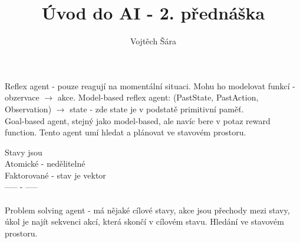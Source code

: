 \documentclass{article}
\title{Úvod do AI - 2. přednáška}
\author{Vojtěch Šára}
\begin{document}
\maketitle
Reflex agent - pouze reagují na momentální situaci. Mohu ho modelovat funkcí - obzervace $\rightarrow$ akce. Model-based reflex agent:
(PastState, PastAction, Observation) $\rightarrow$ state - zde state je v podstatě primitivní paměť.\\
Goal-based agent, stejný jako model-based, ale navíc bere v potaz reward function. Tento agent umí hledat a plánovat ve stavovém prostoru.

Stavy jsou\\
Atomické - nedělitelné\\
Faktorované - stav je vektor\\
----- - -----\\\\

Problem solving agent - má nějaké cílové stavy, akce jsou přechody mezi stavy, úkol je najít sekvenci akcí, která skončí v cílovém
stavu. Hledání ve stavovém prostoru.\\
\end{document}
